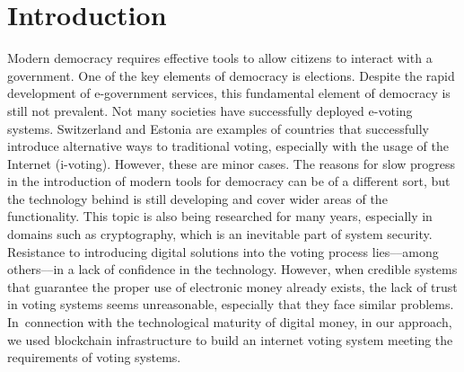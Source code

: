 \documentclass[applsci,article,accept,moreauthors,pdftex]{Definitions/mdpi}
\begin{document}
 


\section{Introduction}


Modern democracy requires effective tools to allow citizens to interact with a government. One of the key elements of democracy is elections. Despite the rapid development of e-government services,
this fundamental element of democracy is still not prevalent. Not many societies have successfully deployed e-voting systems.
Switzerland and Estonia are examples of countries that successfully introduce alternative ways to traditional voting, especially with the usage of the Internet (i-voting). However, these are minor cases.
The reasons for slow progress in the introduction of modern tools for democracy can be of a different sort, but the technology behind is still developing and cover wider areas of the functionality.
This topic is also being researched for many years, 
especially in domains such as cryptography, which is an inevitable part of system security. 
Resistance to introducing digital solutions into the voting process lies––among others––in a lack of confidence in the technology. However, when credible systems that guarantee the proper use of electronic money already exists, the lack of trust in voting systems seems unreasonable, especially that they face similar problems. In~connection with the technological maturity of digital money, in our approach, we used blockchain infrastructure to build an internet voting system meeting the requirements of voting systems.
 
\end{document}
